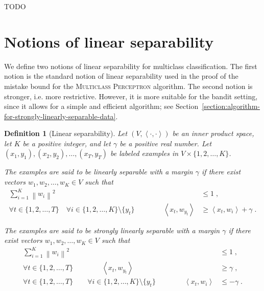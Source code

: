 \documentclass[12pt]{article}
\newtheorem{definition}{Definition}
\newcommand{\ip}[2]{\left\langle #1, #2 \right\rangle} %
\newcommand{\norm}[1]{\left\| #1 \right\|}  %
\begin{document}
TODO


\section{Notions of linear separability}
\label{section:notions-of-linear-separability}

We define two notions of linear separability for multiclass classification. The
first notion is the standard notion of linear separability used in the proof of
the mistake bound for the \textsc{Multiclass Perceptron} algorithm. The second
notion is stronger, i.e. more restrictive. However, it is more suitable for the
bandit setting, since it allows for a simple and efficient algorithm; see
Section~\ref{section:algorithm-for-strongly-linearly-separable-data}.

\begin{definition}[Linear separability]
Let $(V,\ip{\cdot}{\cdot})$ be an inner product space, let $K$ be a positive
integer, and let $\gamma$ be a positive real number. Let $(x_1, y_1), (x_2,
y_2), \dots, (x_T, y_T)$ be labeled examples in $V \times \{1,2,\dots,K\}$.

The examples are said to be \emph{linearly separable with a
margin $\gamma$} if there exist vectors $w_1, w_2, \dots, w_K \in V$ such
that
\begin{align}
\label{equation:linear-separability-1}
\sum_{i=1}^K \norm{w_i}^2 & \le 1 \; , \\
\label{equation:linear-separability-2}
\forall t \in \{1,2,\dots,T\} \quad \forall i \in \{1,2,\dots, K\} \setminus \{y_t\} \qquad \qquad \ip{x_t}{w_{y_t}} & \ge \ip{x_t}{w_i} + \gamma \; .
\end{align}

The examples are said to be \emph{strongly linearly separable with a
margin $\gamma$} if there exist vectors $w_1, w_2, \dots, w_K \in V$ such
that
\begin{align}
\label{equation:strong-linear-separability-1}
\sum_{i=1}^K \norm{w_i}^2 & \le 1 \; , \\
\label{equation:strong-linear-separability-2}
\forall t \in \{1,2,\dots,T\} \qquad \qquad \ip{x_t}{w_{y_t}} &\ge \gamma \; , \\
\label{equation:strong-linear-separability-3}
\forall t \in \{1,2,\dots,T\} \qquad \forall i \in \{1,2,\dots, K\} \setminus \{y_t\} \qquad \qquad \ip{x_t}{w_i} & \le - \gamma \; .
\end{align}
\end{definition}
\end{document}
